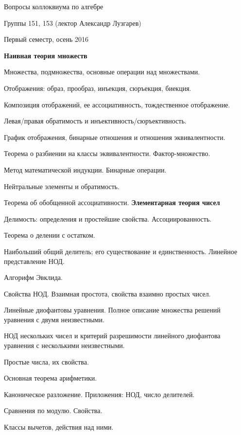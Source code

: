 \documentclass[12pt]{article}
\newcommand\glava[1]{{\bf\hfill #1}}
\begin{document}
\begin{center}
{\Large Вопросы коллоквиума по алгебре}
\par\medskip
Группы 151, 153 (лектор Александр Лузгарев)
\par\medskip
Первый семестр, осень 2016
\end{center}

\glava{Наивная теория множеств}
\begin{compactenum}
\item Множества, подмножества, основные операции над множествами.
\item Отображения: образ, прообраз, инъекция, сюръекция, биекция.
\item Композиция отображений, ее ассоциативность, тождественное
  отображение.
\item Левая/правая обратимость и инъективность/сюръективность.
\item График отображения, бинарные отношения и отношения эквивалентности.
\item Теорема о разбиении на классы эквивалентности. Фактор-множество.
\item Метод математической индукции. Бинарные операции.
\item Нейтральные элементы и обратимость.
\item Теорема об обобщенной ассоциативности.
\glava{Элементарная теория чисел}
\item Делимость: определения и простейшие свойства. Ассоциированность.
\item Теорема о делении с остатком.
\item Наибольший общий делитель; его существование и
единственность. Линейное представление НОД.
\item Алгорифм Эвклида.
\item Свойства НОД. Взаимная простота, свойства взаимно простых чисел.
\item Линейные диофантовы уравнения. Полное описание множества решений
уравнения с двумя неизвестными.
\item НОД нескольких чисел и критерий разрешимости линейного диофантова
уравнения с несколькими неизвестными.
\item Простые числа, их свойства.
\item Основная теорема арифметики.
\item Каноническое разложение. Приложения: НОД, число делителей.
\item Сравнения по модулю. Свойства.
\item Классы вычетов, действия над ними.

\end{compactenum}
\end{document}
